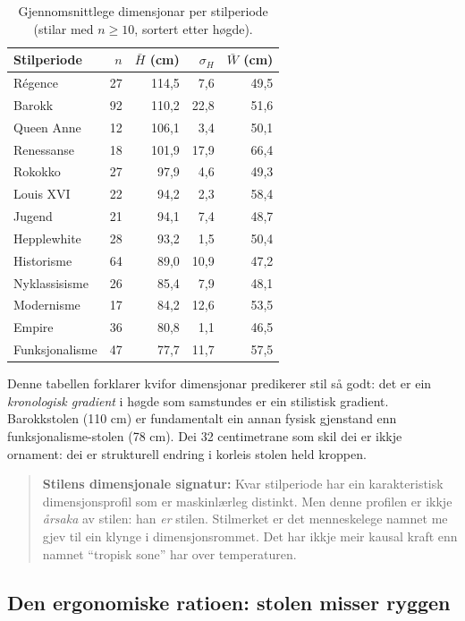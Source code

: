 \documentclass[10pt, a4paper, twocolumn]{article}
\begin{document}
\begin{table}[H]
\centering
\caption{Gjennomsnittlege dimensjonar per stilperiode (stilar med $n \geq 10$, sortert etter høgde).}
\label{tab:style_dims}
\begin{tabular}{@{}lrrrr@{}}
\toprule
\textbf{Stilperiode} & \textbf{$n$} & \textbf{$\bar{H}$ (cm)} & \textbf{$\sigma_H$} & \textbf{$\bar{W}$ (cm)} \\
\midrule
Régence & 27 & 114,5 & 7,6 & 49,5 \\
Barokk & 92 & 110,2 & 22,8 & 51,6 \\
Queen Anne & 12 & 106,1 & 3,4 & 50,1 \\
Renessanse & 18 & 101,9 & 17,9 & 66,4 \\
Rokokko & 27 & 97,9 & 4,6 & 49,3 \\
Louis XVI & 22 & 94,2 & 2,3 & 58,4 \\
Jugend & 21 & 94,1 & 7,4 & 48,7 \\
Hepplewhite & 28 & 93,2 & 1,5 & 50,4 \\
Historisme & 64 & 89,0 & 10,9 & 47,2 \\
Nyklassisisme & 26 & 85,4 & 7,9 & 48,1 \\
Modernisme & 17 & 84,2 & 12,6 & 53,5 \\
Empire & 36 & 80,8 & 1,1 & 46,5 \\
Funksjonalisme & 47 & 77,7 & 11,7 & 57,5 \\
\bottomrule
\end{tabular}
\end{table}

Denne tabellen forklarer kvifor dimensjonar predikerer stil så godt: det er ein \emph{kronologisk gradient} i høgde som samstundes er ein stilistisk gradient. Barokkstolen (110 cm) er fundamentalt ein annan fysisk gjenstand enn funksjonalisme-stolen (78 cm). Dei 32 centimetrane som skil dei er ikkje ornament: dei er strukturell endring i korleis stolen held kroppen.

\begin{quote}
\textbf{Stilens dimensjonale signatur:} Kvar stilperiode har ein karakteristisk dimensjonsprofil som er maskinlærleg distinkt. Men denne profilen er ikkje \emph{årsaka} av stilen: han \emph{er} stilen. Stilmerket er det menneskelege namnet me gjev til ein klynge i dimensjonsrommet. Det har ikkje meir kausal kraft enn namnet ``tropisk sone'' har over temperaturen.
\end{quote}


\subsection{Den ergonomiske ratioen: stolen misser ryggen}
\end{document}
